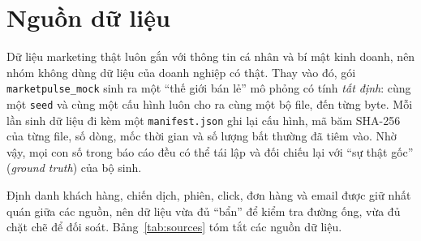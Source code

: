 
\section{Nguồn dữ liệu}
\label{sec:c2-nguon-du-lieu}

Dữ liệu marketing thật luôn gắn với thông tin cá nhân và bí mật kinh doanh, nên nhóm không dùng dữ liệu của doanh nghiệp có thật. Thay vào đó, gói \texttt{marketpulse\_mock} sinh ra một ``thế giới bán lẻ'' mô phỏng có tính \emph{tất định}: cùng một \texttt{seed} và cùng một cấu hình luôn cho ra cùng một bộ file, đến từng byte. Mỗi lần sinh dữ liệu đi kèm một \texttt{manifest.json} ghi lại cấu hình, mã băm SHA-256 của từng file, số dòng, mốc thời gian và số lượng bất thường đã tiêm vào. Nhờ vậy, mọi con số trong báo cáo đều có thể tái lập và đối chiếu lại với ``sự thật gốc'' (\emph{ground truth}) của bộ sinh.

Định danh khách hàng, chiến dịch, phiên, click, đơn hàng và email được giữ nhất quán giữa các nguồn, nên dữ liệu vừa đủ ``bẩn'' để kiểm tra đường ống, vừa đủ chặt chẽ để đối soát. Bảng~\ref{tab:sources} tóm tắt các nguồn dữ liệu.

